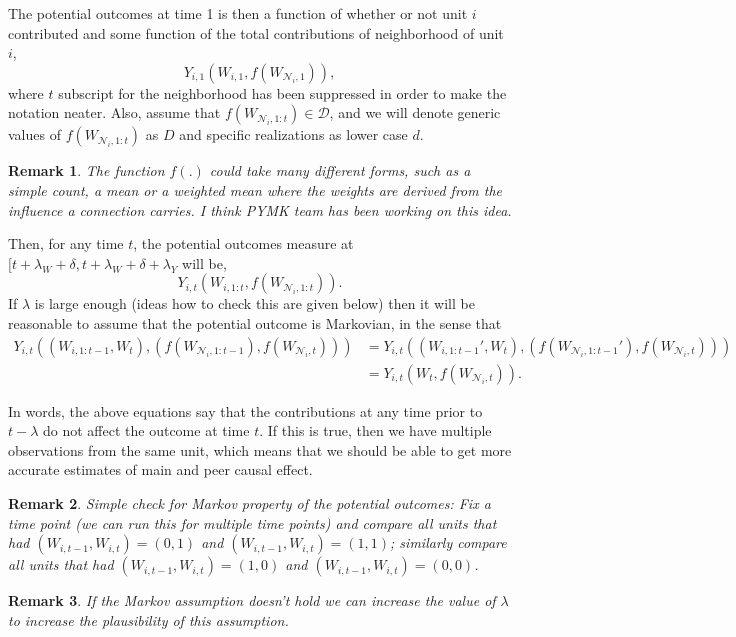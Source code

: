 \documentclass[a4paper]{article}
\newtheorem{remark}{Remark}
\begin{document}
The potential outcomes at time 1 is then a function of whether or not unit $i$ contributed and some function of the total contributions of neighborhood of unit $i$,
\[
	Y_{i,1} (W_{i,1}, f(W_{\mathcal{N}_{i},1})),
\]
where $t$ subscript for the neighborhood has been suppressed in order to make the notation neater. Also, assume that 
$f(W_{\mathcal{N}_{i},1:t}) \in \mathcal{D}$, and we will denote generic values of $f(W_{\mathcal{N}_{i},1:t})$ as $D$ and specific realizations as lower case $d$. 
\begin{remark}
	The function $f(.)$ could take many different forms, such as a simple count, a mean or a weighted mean where the weights are derived from the influence a connection carries. I think PYMK team has been working on this idea. 
\end{remark}
Then, for any time $t$, the potential outcomes measure at $[t+\lambda_W +\delta, t+\lambda_W + \delta + \lambda_Y$ will be,
\[
	Y_{i,t} (W_{i,1:t}, f(W_{\mathcal{N}_{i},1:t})).
\]
If $\lambda$ is large enough (ideas how to check this are given below) then it will be reasonable to assume that the potential outcome is Markovian, in the sense that
\begin{align*}
	Y_{i,t} ((W_{i,1:t-1}, W_t), (f(W_{\mathcal{N}_{i},1:t-1}), f(W_{\mathcal{N}_{i},t}))) &= 
	Y_{i,t} ((W_{i,1:t-1}', W_t), (f(W_{\mathcal{N}_{i},1:t-1}'), f(W_{\mathcal{N}_{i},t}))) \\
	&= Y_{i,t} (W_t, f(W_{\mathcal{N}_{i},t})). 
\end{align*}

In words, the above equations say that the contributions at any time prior to $t-\lambda$ do not affect the outcome at time $t$. If this is true, then we have multiple observations from the same unit, which means that we should be able to get more accurate estimates of main and peer causal effect. 


\begin{remark}
	Simple check for Markov property of the potential outcomes: Fix a time point (we can run this for multiple time points) and compare all units that had $(W_{i,t-1}, W_{i,t}) = (0,1)$ and $(W_{i,t-1}, W_{i,t}) = (1,1)$; similarly compare all units that had $(W_{i,t-1}, W_{i,t}) = (1,0)$ and $(W_{i,t-1}, W_{i,t}) = (0,0)$. 
\end{remark}

\begin{remark}
	If the Markov assumption doesn't hold we can increase the value of $\lambda$ to increase the plausibility of this assumption.
\end{remark}
\end{document}
